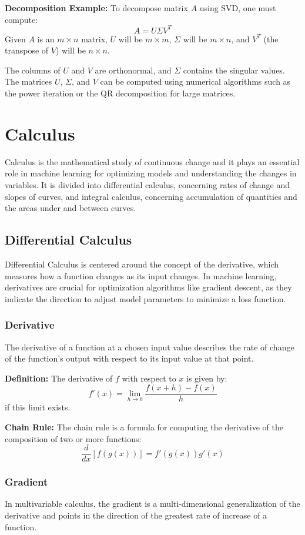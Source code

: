 \documentclass{article}
\begin{document}
	\textbf{Decomposition Example:}
	To decompose matrix \( A \) using SVD, one must compute:
	\[
	A = U\Sigma V^T
	\]
	Given \( A \) is an \( m \times n \) matrix, \( U \) will be \( m \times m \), \( \Sigma \) will be \( m \times n \), and \( V^T \) (the transpose of \( V \)) will be \( n \times n \).
	
	The columns of \( U \) and \( V \) are orthonormal, and \( \Sigma \) contains the singular values. The matrices \( U \), \( \Sigma \), and \( V \) can be computed using numerical algorithms such as the power iteration or the QR decomposition for large matrices.
	
	\section{Calculus}
	Calculus is the mathematical study of continuous change and it plays an essential role in machine learning for optimizing models and understanding the changes in variables. It is divided into differential calculus, concerning rates of change and slopes of curves, and integral calculus, concerning accumulation of quantities and the areas under and between curves.
	
	\subsection{Differential Calculus}
	Differential Calculus is centered around the concept of the derivative, which measures how a function changes as its input changes. In machine learning, derivatives are crucial for optimization algorithms like gradient descent, as they indicate the direction to adjust model parameters to minimize a loss function.
	
	\subsubsection{Derivative}
	The derivative of a function at a chosen input value describes the rate of change of the function's output with respect to its input value at that point.
	
	\textbf{Definition:}
	The derivative of \( f \) with respect to \( x \) is given by:
	\[
	f'(x) = \lim_{h \to 0} \frac{f(x+h) - f(x)}{h}
	\]
	if this limit exists.
	
	\textbf{Chain Rule:}
	The chain rule is a formula for computing the derivative of the composition of two or more functions:
	\[
	\frac{d}{dx}[f(g(x))] = f'(g(x))g'(x)
	\]
	
	\subsubsection{Gradient}
	In multivariable calculus, the gradient is a multi-dimensional generalization of the derivative and points in the direction of the greatest rate of increase of a function.
	
\end{document}
